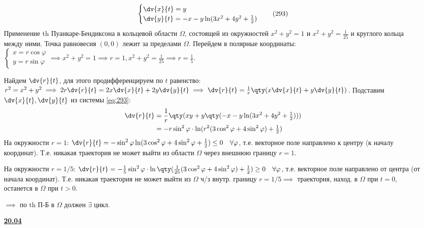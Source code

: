 \begin{example}
	\begin{equation} \label{eq:293}
		\begin{cases}
			\dv{x}{t} = y \\
			\dv{y}{t} = -x - y\ln(3x^2+4y^2+\frac{1}{2})
		\end{cases} \quad (293)
	\end{equation}
	Применение th Пуанкаре-Бендиксона в кольцевой области $\Omega$, состоящей из окружностей $x^2+y^2=1$ и $x^2+y^2=\frac{1}{25}$ и круглого кольца между ними.
	Точка равновесия $(0,0)$ лежит за пределами $\Omega$.
	Перейдем в полярные координаты: $\begin{cases} x = r\cos\varphi \\ y = r\sin\varphi \end{cases} \implies x^2+y^2 = 1 \implies r=1, x^2+y^2=\frac{1}{25} \implies r=\frac{1}{5}$.
	
	Найдем $\dv{r}{t}$, для этого продифференцируем по $t$ равенство: $r^2 = x^2+y^2 \implies 2r\dv{r}{t} = 2x\dv{x}{t} + 2y\dv{y}{t} \implies \dv{r}{t} = \frac{1}{r}\qty(x\dv{x}{t} + y\dv{y}{t})$. Подставим $\dv{x}{t}, \dv{y}{t}$ из системы \eqref{eq:293}:
	\begin{align*}
		\dv{r}{t} &= \frac{1}{r}\qty( xy + y\qty(-x - y\ln(3x^2+4y^2+\tfrac{1}{2})) ) \\
		&= -r\sin^2\varphi \cdot \ln(r^2(3\cos^2\varphi+4\sin^2\varphi)+\tfrac{1}{2})
	\end{align*}
	На окружности $r=1$: $\dv{r}{t} = -\sin^2\varphi \ln(3\cos^2\varphi+4\sin^2\varphi+\frac{1}{2}) \le 0 \quad \forall \varphi$, т.е. векторное поле направлено к центру (к началу координат). Т.е. никакая траектория не может выйти из области $\Omega$ через внешнюю границу $r=1$.
	
	На окружности $r=1/5$: $\dv{r}{t} = -\frac{1}{5}\sin^2\varphi \cdot \ln\qty(\frac{1}{25}(3\cos^2\varphi+4\sin^2\varphi)+\frac{1}{2}) \ge 0 \quad \forall \varphi$, т.е. векторное поле направлено от центра (от начала координат). Т.е. никакая траектория не может выйти из $\Omega$ ч/з внутр. границу $r=1/5 \implies$ траектория, наход. в $\Omega$ при $t=0$, останется в $\Omega$ при $t>0$.
	
	$\implies$ по th П-Б в $\Omega$ должен $\exists$ цикл.
\end{example}

\vspace{0.3cm}
\noindent\underline{\textbf{20.04}}

